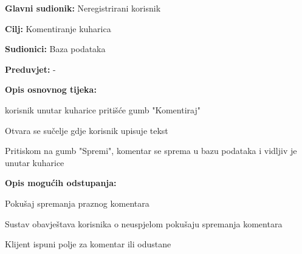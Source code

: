 					\noindent {}
					\begin{packed_item}
	
						\item \textbf{Glavni sudionik: }Neregistrirani korisnik
						\item  \textbf{Cilj:} Komentiranje kuharica
						\item  \textbf{Sudionici:} Baza podataka
						\item  \textbf{Preduvjet:} -
						\item  \textbf{Opis osnovnog tijeka:} 
						
						\item[] \begin{packed_enum}
	
							\item korisnik unutar kuharice pritišće gumb "Komentiraj"
							\item Otvara se sučelje gdje korisnik upisuje tekst
							\item Pritiskom na gumb "Spremi", komentar se sprema u bazu podataka i vidljiv je unutar kuharice
						\end{packed_enum}
						
						\item  \textbf{Opis mogućih odstupanja:}
						
						\item[] \begin{packed_item}
	
							\item[2.a] Pokušaj spremanja praznog komentara
							\item[] \begin{packed_enum}
								
								\item Sustav obavještava korisnika o neuspjelom pokušaju spremanja komentara 
								\item Klijent ispuni polje za komentar ili odustane
								
							\end{packed_enum}

						\end{packed_item}
					\end{packed_item}



